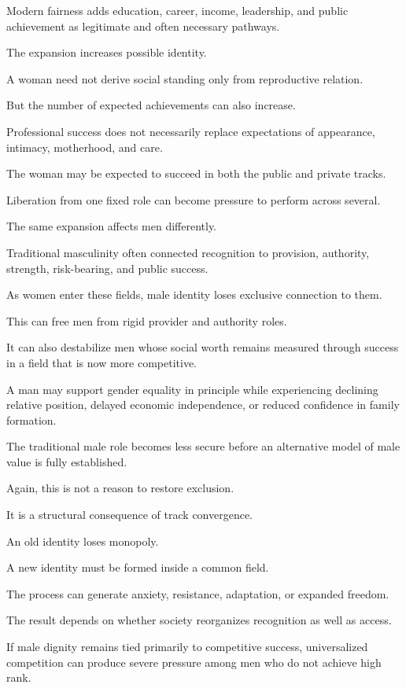 Modern fairness adds education, career, income, leadership, and public achievement as legitimate and often necessary pathways.

The expansion increases possible identity.

A woman need not derive social standing only from reproductive relation.

But the number of expected achievements can also increase.

Professional success does not necessarily replace expectations of appearance, intimacy, motherhood, and care.

The woman may be expected to succeed in both the public and private tracks.

Liberation from one fixed role can become pressure to perform across several.

The same expansion affects men differently.

Traditional masculinity often connected recognition to provision, authority, strength, risk-bearing, and public success.

As women enter these fields, male identity loses exclusive connection to them.

This can free men from rigid provider and authority roles.

It can also destabilize men whose social worth remains measured through success in a field that is now more competitive.

A man may support gender equality in principle while experiencing declining relative position, delayed economic independence, or reduced confidence in family formation.

The traditional male role becomes less secure before an alternative model of male value is fully established.

Again, this is not a reason to restore exclusion.

It is a structural consequence of track convergence.

An old identity loses monopoly.

A new identity must be formed inside a common field.

The process can generate anxiety, resistance, adaptation, or expanded freedom.

The result depends on whether society reorganizes recognition as well as access.

If male dignity remains tied primarily to competitive success, universalized competition can produce severe pressure among men who do not achieve high rank.

